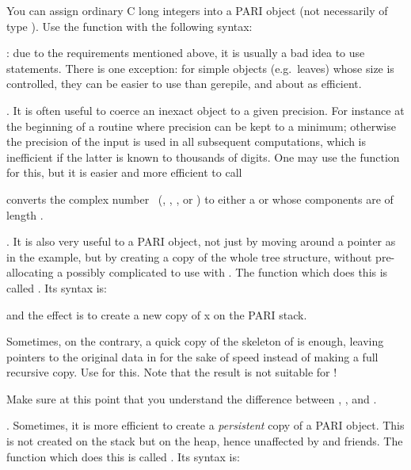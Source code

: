 You can assign ordinary C long integers into a PARI object (not necessarily
of type ). Use the function  with the following
syntax:


: due to the requirements mentioned above, it is usually
a bad idea to use  statements. There is one exception: for simple
objects (e.g.~leaves) whose size is controlled, they can be easier to use than
gerepile, and about as efficient.

. It is often useful to coerce an inexact object to a
given precision. For instance at the beginning of a routine where precision
can be kept to a minimum; otherwise the precision of the input is used in all
subsequent computations, which is inefficient if the latter is known to
thousands of digits. One may use the  function for this, but it
is easier and more efficient to call

 converts the complex number~
(, , ,  or ) to either
a  or  whose components are  of length
.

. It is also very useful to  a PARI object, not
just by moving around a pointer as in the  example, but by
creating a copy of the whole tree structure, without pre-allocating a
possibly complicated  to use with . The function which
does this is called . Its syntax is:


\noindent and the effect is to create a new copy of x on the PARI stack.

Sometimes, on the contrary, a quick copy of the skeleton of  is
enough, leaving pointers to the original data in  for the sake of
speed instead of making a full recursive copy. Use
 for this. Note that the result is not suitable
for  !

Make sure at this point that you understand the difference between , ,  and .

.\label{se:clone}
Sometimes, it is more efficient to create a \emph{persistent} copy of a PARI
object. This is not created on the stack but on the heap, hence unaffected by
 and friends. The function which does this is called
. Its syntax is:

